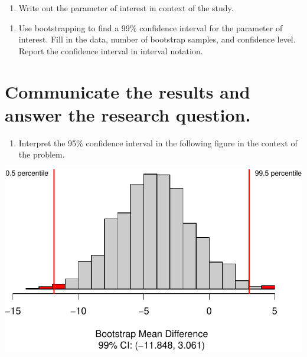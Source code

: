 \documentclass[
]{report}
\providecommand{\tightlist}{%
  \setlength{\itemsep}{0pt}\setlength{\parskip}{0pt}}
\begin{document}
\vspace{1in}

\begin{enumerate}
\def\labelenumi{\arabic{enumi}.}
\setcounter{enumi}{15}
\tightlist
\item
  Write out the parameter of interest in context of the study.
\end{enumerate}

\vspace{1in}

\begin{enumerate}
\def\labelenumi{\arabic{enumi}.}
\setcounter{enumi}{16}
\tightlist
\item
  Use bootstrapping to find a 99\% confidence interval for the parameter of interest. Fill in the data, number of bootstrap samples, and confidence level. Report the confidence interval in interval notation.
\end{enumerate}

\vspace{1in}

\hypertarget{communicate-the-results-and-answer-the-research-question.}{%
\section{Communicate the results and answer the research question.}\label{communicate-the-results-and-answer-the-research-question.}}

\begin{enumerate}
\def\labelenumi{\arabic{enumi}.}
\setcounter{enumi}{17}
\tightlist
\item
  Interpret the 95\% confidence interval in the following figure in the context of the problem.
\end{enumerate}

\vspace{1in}

\begin{center}\includegraphics[width=0.7\linewidth]{08-paired_files/figure-latex/unnamed-chunk-5-1} \end{center}
\end{document}
